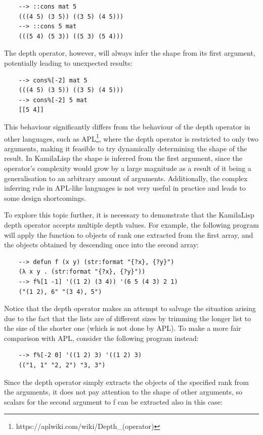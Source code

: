 \begin{Verbatim}
    --> ::cons mat 5
    (((4 5) (3 5)) ((3 5) (4 5)))
    --> ::cons 5 mat
    (((5 4) (5 3)) ((5 3) (5 4)))
\end{Verbatim}

The depth operator, however, will always infer the shape from its first argument, potentially leading to unexpected results:

\begin{Verbatim}
    --> cons%[-2] mat 5
    (((4 5) (3 5)) ((3 5) (4 5)))
    --> cons%[-2] 5 mat
    [[5 4]]
\end{Verbatim}

This behaviour significantly differs from the behaviour of the depth operator in other languages, such as APL\footnote{https://aplwiki.com/wiki/Depth\_(operator)}, where the depth operator is restricted to only two arguments, making it feasible to try dynamically determining the shape of the result. In KamilaLisp the shape is inferred from the first argument, since the operator's complexity would grow by a large magnitude as a result of it being a generalisation to an arbitrary amount of arguments. Additionally, the complex inferring rule in APL-like languages is not very useful in practice and leads to some design shortcomings.

To explore this topic further, it is necessary to demonstrate that the KamilaLisp depth operator accepts multiple depth values. For example, the following program will apply the function to objects of rank one extracted from the first array, and the objects obtained by descending once into the second array:

\begin{Verbatim}
    --> defun f (x y) (str:format "{?x}, {?y}")
    (λ x y . (str:format "{?x}, {?y}"))
    --> f%[1 -1] '((1 2) (3 4)) '(6 5 (4 3) 2 1)
    ("(1 2), 6" "(3 4), 5")
\end{Verbatim}

Notice that the depth operator makes an attempt to salvage the situation arising due to the fact that the lists are of different sizes by trimming the longer list to the size of the shorter one (which is not done by APL). To make a more fair comparison with APL, consider the following program instead:

\begin{Verbatim}
    --> f%[-2 0] '((1 2) 3) '((1 2) 3)
    (("1, 1" "2, 2") "3, 3")
\end{Verbatim}

Since the depth operator simply extracts the objects of the specified rank from the arguments, it does not pay attention to the shape of other arguments, so scalars for the second argument to f can be extracted also in this case:


